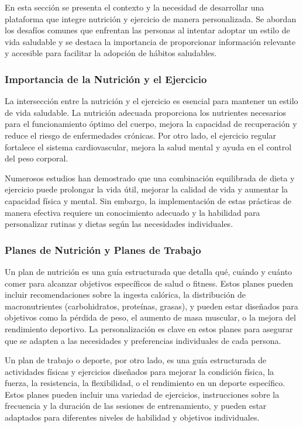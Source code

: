 En esta sección se presenta el contexto y la necesidad de desarrollar una plataforma que integre nutrición y ejercicio de manera personalizada. Se abordan los desafíos comunes que enfrentan las personas al intentar adoptar un estilo de vida saludable y se destaca la importancia de proporcionar información relevante y accesible para facilitar la adopción de hábitos saludables.

\subsubsection{Importancia de la Nutrición y el Ejercicio}
La intersección entre la nutrición y el ejercicio es esencial para mantener un estilo de vida saludable. La nutrición adecuada proporciona los nutrientes necesarios para el funcionamiento óptimo del cuerpo, mejora la capacidad de recuperación y reduce el riesgo de enfermedades crónicas. Por otro lado, el ejercicio regular fortalece el sistema cardiovascular, mejora la salud mental y ayuda en el control del peso corporal.

Numerosos estudios han demostrado que una combinación equilibrada de dieta y ejercicio puede prolongar la vida útil, mejorar la calidad de vida y aumentar la capacidad física y mental. Sin embargo, la implementación de estas prácticas de manera efectiva requiere un conocimiento adecuado y la habilidad para personalizar rutinas y dietas según las necesidades individuales.

\subsubsection{Planes de Nutrición y Planes de Trabajo}
Un plan de nutrición es una guía estructurada que detalla qué, cuándo y cuánto comer para alcanzar objetivos específicos de salud o fitness. Estos planes pueden incluir recomendaciones sobre la ingesta calórica, la distribución de macronutrientes (carbohidratos, proteínas, grasas), y pueden estar diseñados para objetivos como la pérdida de peso, el aumento de masa muscular, o la mejora del rendimiento deportivo. La personalización es clave en estos planes para asegurar que se adapten a las necesidades y preferencias individuales de cada persona.

Un plan de trabajo o deporte, por otro lado, es una guía estructurada de actividades físicas y ejercicios diseñados para mejorar la condición física, la fuerza, la resistencia, la flexibilidad, o el rendimiento en un deporte específico. Estos planes pueden incluir una variedad de ejercicios, instrucciones sobre la frecuencia y la duración de las sesiones de entrenamiento, y pueden estar adaptados para diferentes niveles de habilidad y objetivos individuales.


